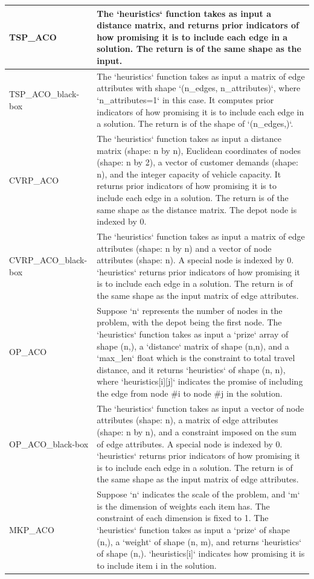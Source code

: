 {\begin{longtable}{l|p{10cm}}
    \midrule
    TSP\_ACO &  The `heuristics` function takes as input a distance matrix, and returns prior indicators of how promising it is to include each edge in a solution. The return is of the same shape as the input.\\ 
    \midrule
    TSP\_ACO\_black-box &  The `heuristics` function takes as input a matrix of edge attributes with shape `(n\_edges, n\_attributes)`, where `n\_attributes=1` in this case. It computes prior indicators of how promising it is to include each edge in a solution. The return is of the shape of `(n\_edges,)`. \\
    \midrule
    CVRP\_ACO & The `heuristics` function takes as input a distance matrix (shape: n by n), Euclidean coordinates of nodes (shape: n by 2), a vector of customer demands (shape: n), and the integer capacity of vehicle capacity. It returns prior indicators of how promising it is to include each edge in a solution. The return is of the same shape as the distance matrix. The depot node is indexed by 0. \\ 
    \midrule
    CVRP\_ACO\_black-box & The `heuristics` function takes as input a matrix of edge attributes (shape: n by n) and a vector of node attributes (shape: n). A special node is indexed by 0. `heuristics` returns prior indicators of how promising it is to include each edge in a solution. The return is of the same shape as the input matrix of edge attributes.  \\
    \midrule
    OP\_ACO & Suppose `n` represents the number of nodes in the problem, with the depot being the first node. The `heuristics` function takes as input a `prize` array of shape (n,), a `distance` matrix of shape (n,n), and a `max\_len` float which is the constraint to total travel distance, and it returns `heuristics` of shape (n, n), where `heuristics[i][j]` indicates the promise of including the edge from node \#i to node \#j in the solution. \\ 
    \midrule
    OP\_ACO\_black-box & The `heuristics` function takes as input a vector of node attributes (shape: n), a matrix of edge attributes (shape: n by n), and a constraint imposed on the sum of edge attributes. A special node is indexed by 0. `heuristics` returns prior indicators of how promising it is to include each edge in a solution. The return is of the same shape as the input matrix of edge attributes.  \\
    \midrule
    MKP\_ACO & Suppose `n` indicates the scale of the problem, and `m` is the dimension of weights each item has. The constraint of each dimension is fixed to 1. The `heuristics` function takes as input a `prize` of shape (n,), a `weight` of shape (n, m), and returns `heuristics` of shape (n,). `heuristics[i]` indicates how promising it is to include item i in the solution.\\ 

\end{longtable}}
